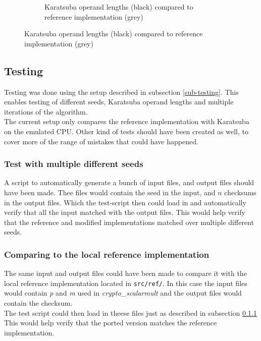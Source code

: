 \begin{figure}[H]
\begin{subfigure}{\textwidth}
    \centering
    \caption{Karatsuba operand lengths (black) compared to reference implementation (grey)}
\end{subfigure}
\label{karatsubacomparison}
\end{figure}


\subsection{Testing}
Testing was done using the setup described in subsection \ref{sub-testing}. This enables testing of different seeds, Karatsuba operand lengths and multiple iterations of the algorithm.
\\
The current setup only compares the reference implementation with Karatsuba on the emulated CPU. Other kind of tests should have been created as well, to cover more of the range of mistakes that could have happened.\\
\subsubsection{Test with multiple different seeds}
\label{missing-test-1}
A script to automatically generate a bunch of input files, and output files should have been made. Thee files would contain the seed in the input, and $n$ checksums in the output files. Which the test-script then could load in and automatically verify that all the input matched with the output files. This would help verify that the reference and modified implementations matched over multiple different seeds.

\subsubsection{Comparing to the local reference implementation}
The same input and output files could have been made to compare it with the local reference implementation located in \texttt{src/ref/}. In this case the input files would contain \textit{p} and \textit{m} used in \textit{crypto\_scalarmult} and the output files would contain the checksum.\\ The test script could then load in theese files just as described in subsection \ref{missing-test-1} This would help verify that the ported version matches the reference implementation.

